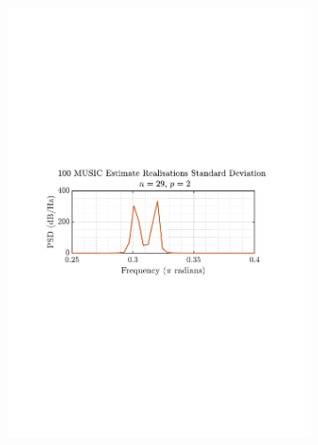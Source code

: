 \documentclass[12pt]{article}
\begin{document}
\begin{figure}[H]
\begin{subfigure}{0.49\textwidth}
			\includegraphics[trim={2.2cm 11cm 3.15cm  11.2cm}, clip, width=\textwidth]{../MATLAB/figures/q1_3e_fig04.pdf} 
		\end{subfigure}
		\begin{subfigure}{0.49\textwidth}
			\centering

\end{subfigure}
\end{figure}
\end{document}
